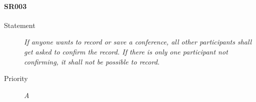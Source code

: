 \paragraph{SR003}
  \begin{description}
  \item [Statement] 
    \textit{ If anyone wants to record or save a conference, all other participants shall get asked to confirm the record.
			If there is only one participant not confirming, it shall not be possible to record.}
  \item [Priority] \textit{A}
\end{description}